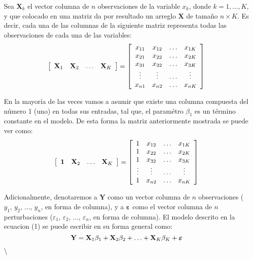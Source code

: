 \documentclass[
  a4paper,
]{article}
\begin{document}
Sea \(\mathbf{X}_k\) el vector columna de \(n\) observaciones de la
variable \(x_k\), donde \(k = 1, \ldots, K\), y que colocado en una
matriz da por resultado un arreglo \(\mathbf{X}\) de tamaño
\(n \times K\). Es decir, cada una de las columnas de la siguiente
matriz representa todas las observaciones de cada una de las variables:
\[
    \left[ 
    \begin{array}{c c c c}
    \mathbf{X}_1 & \mathbf{X}_2 & \ldots & \mathbf{X}_K 
    \end{array} 
    \right]
    = 
    \left[ 
    \begin{array}{c c c c}
    x_{11} & x_{12} & \ldots & x_{1K}\\
    x_{21} & x_{22} & \ldots & x_{2K}\\
    x_{31} & x_{32} & \ldots & x_{3K}\\
    \vdots & \vdots & \ldots & \vdots\\
    x_{n1} & x_{n2} & \ldots & x_{nK}\\
    \end{array} 
    \right]
\]

En la mayoría de las veces vamos a asumir que existe una columna
compuesta del número 1 (uno) en todas sus entradas, tal que, el
paramétro \(\beta_1\) es un término constante en el modelo. De esta
forma la matriz anteriormente mostrada se puede ver como: \[
    \left[ 
    \begin{array}{c c c c}
    \mathbf{1} & \mathbf{X}_2 & \ldots & \mathbf{X}_K 
    \end{array} 
    \right]
    = 
    \left[ 
    \begin{array}{c c c c}
    1 & x_{12} & \ldots & x_{1K}\\
    1 & x_{22} & \ldots & x_{2K}\\
    1 & x_{32} & \ldots & x_{3K}\\
    \vdots & \vdots & \ldots & \vdots\\
    1 & x_{n2} & \ldots & x_{nK}\\
    \end{array} 
    \right]
\]

Adicionalmente, denotaremos a \(\mathbf{Y}\) como un vector columna de
\(n\) observaciones (\(y_1\), \(y_2\), \(\ldots\), \(y_n\), en forma de
columna), y a \(\boldsymbol{\varepsilon}\) como el vector columna de
\(n\) perturbaciones (\(\varepsilon_1\), \(\varepsilon_2\), \(\ldots\),
\(\varepsilon_n\), en forma de columna). El modelo descrito en la
ecuaci\textquotesingle on (1) se puede escribir en su forma general
como: \[
{\bf{Y}} = {\bf {X}}_1\beta_1 + {\bf{X}}_2\beta_2 + \ldots + {\bf{X}}_K\beta_K + {\boldsymbol{\varepsilon}}
\] \textbackslash{}
\end{document}
